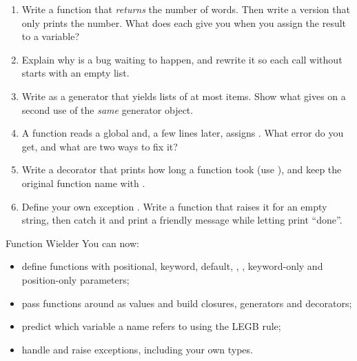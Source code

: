 \begin{practice}
\begin{enumerate}[leftmargin=*,itemsep=2pt]
\item Write a function  that \emph{returns} the number of words. Then write a
  version that only prints the number. What does each give you when you assign the result to a
  variable?
\item Explain why  is a bug waiting to happen, and rewrite it so each
  call without  starts with an empty list.
\item Write  as a generator that yields lists of at most  items. Show
  what  gives on a second use of the \emph{same} generator object.
\item A function reads a global  and, a few lines later, assigns . What
  error do you get, and what are two ways to fix it?
\item Write a decorator  that prints how long a function took (use
  ), and keep the original function name with .
\item Define your own exception . Write a function that raises it for an
  empty string, then catch it and print a friendly message while letting  print
  ``done''.
\end{enumerate}
\end{practice}

\begin{achievement}{Function Wielder}
You can now:
\begin{itemize}[leftmargin=*,itemsep=1pt]
\item define functions with positional, keyword, default, , ,
  keyword-only and position-only parameters;
\item pass functions around as values and build closures, generators and decorators;
\item predict which variable a name refers to using the LEGB rule;
\item handle and raise exceptions, including your own types.
\end{itemize}
\end{achievement}
